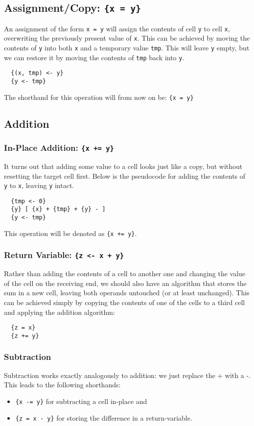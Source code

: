 \tocless\subsection{Assignment/Copy: \texttt{\{x = y\}}}
An assignment of the form \texttt{x = y} will assign the contents of cell \texttt{y} to cell \texttt{x}, overwriting the previously present value of \texttt{x}. This can be achieved by moving the contents of \texttt{y} into both \texttt{x} and a temporary value \texttt{tmp}. This will leave \texttt{y} empty, but we can restore it by moving the contents of \texttt{tmp} back into \texttt{y}.
\begin{lstlisting}
  {(x, tmp) <- y}
  {y <- tmp}
\end{lstlisting}
The shorthand for this operation will from now on be: \texttt{\{x = y\}}

\tocless\subsection{Addition}
\tocless\subsubsection{In-Place Addition: \texttt{\{x += y\}}}
It turns out that adding some value to a cell looks just like a copy, but without resetting the target cell first. Below is the pseudocode for adding the contents of \texttt{y} to \texttt{x}, leaving \texttt{y} intact.
\begin{lstlisting}
  {tmp <- 0}
  {y} [ {x} + {tmp} + {y} - ]
  {y <- tmp}
\end{lstlisting}
This operation will be denoted as \texttt{\{x += y\}}.

\tocless\subsubsection{Return Variable: \texttt{\{z <- x + y\}}}
Rather than adding the contents of a cell to another one and changing the value of the cell on the receiving end, we should also have an algorithm that stores the sum in a new cell, leaving both operands untouched (or at least unchanged). This can be achieved simply by copying the contents of one of the cells to a third cell and applying the addition algorithm:
\begin{lstlisting}
  {z = x}
  {z += y}
\end{lstlisting}

\tocless\subsubsection{Subtraction}
Subtraction works exactly analogously to addition: we just replace the + with a -. This leads to the following shorthands:
\begin{itemize}
\item \texttt{\{x -= y\}} for subtracting a cell in-place and
\item \texttt{\{z = x - y\}} for storing the difference in a return-variable.
\end{itemize}

